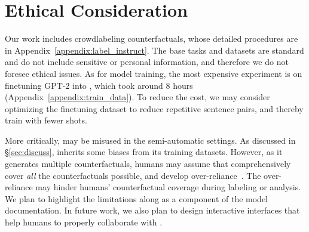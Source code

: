 
\section{Ethical Consideration}

Our work includes crowdlabeling counterfactuals, whose detailed procedures are in Appendix~\ref{appendix:label_instruct}.
The base tasks and datasets are standard and do not include sensitive or personal information, and therefore we do not foresee ethical issues. 
As for model training, the most expensive experiment is on finetuning GPT-2 into \sysname, which took around 8 hours (Appendix~\ref{appendix:train_data}).
To reduce the cost, we may consider optimizing the finetuning dataset to reduce repetitive sentence pairs, and thereby train \sysname with fewer shots.

More critically, \sysname may be misused in the semi-automatic settings. 
As discussed in \S\ref{sec:discuss}, \sysname inherits some biases from its training datasets.
However, as it generates multiple counterfactuals, humans may assume that \sysname comprehensively cover \emph{all} the counterfactuals possible, and develop over-reliance~\cite{bansal2021does}.
The over-reliance may hinder humans' counterfactual coverage during labeling or analysis.
We plan to highlight the limitations along as a component of the model documentation. 
In future work, we also plan to design interactive interfaces that help humans to properly collaborate with \sysname.
